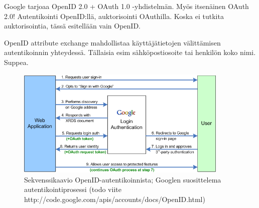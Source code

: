 \documentclass[finnish,gradu]{tktltiki}
\begin{document}
  Google tarjoaa OpenID 2.0 + OAuth 1.0 -yhdistelmän. Myös itsenäinen OAuth 2.0!  Autentikointi OpenID:llä, auktorisointi OAuthilla. Koska ei tutkita auktorisointia, tässä esitellään vain OpenID.

  OpenID attribute exchange mahdollistaa käyttäjätietojen välittämisen autentikoinnin yhteydessä. Tällaisia esim sähköpostiosoite tai henkilön koko nimi. Suppea.

  \begin{figure}
    \centering
    \includegraphics[width=0.9\textwidth]{images/google_openid_diagram.png}
    \caption{Sekvenssikaavio OpenID-autentikoinnista; Googlen suosittelema autentikointiprosessi (todo viite http://code.google.com/apis/accounts/docs/OpenID.html)}
    \label{fig:sekvenssikaavio_google_openid}
  \end{figure}
\end{document}
